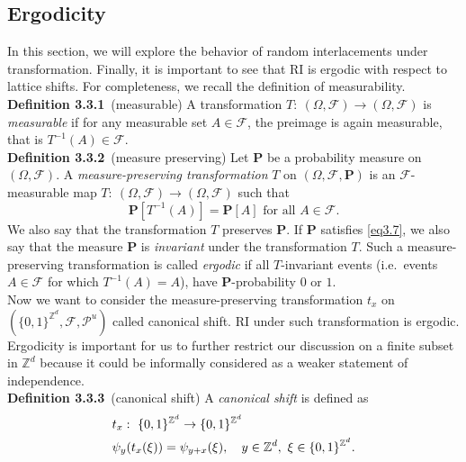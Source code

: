 \documentclass[
11pt, %
a4paper, %
oneside, %
headinclude,footinclude, %
BCOR5mm, %
]{scrartcl}
\begin{document}
\subsection{Ergodicity}
In this section, we will explore the behavior of random interlacements under transformation. Finally, it is important to see that RI is ergodic with respect to lattice shifts. For completeness, we recall the definition of measurability.
\vspace{0.6em}\\\textbf{Definition 3.3.1}\ (measurable) A transformation $T:\ (\Omega,\mathscr{F}) \rightarrow (\Omega,\mathscr{F})$ is \textit{measurable} if for any measurable set $A \in \mathscr{F}$, the preimage is again measurable, that is $T^{-1}(A) \in \mathscr{F}$.
\vspace{0.6em}\\\textbf{Definition 3.3.2}\ (measure preserving) Let $\mathbf{P}$ be a probability measure on $(\Omega, \mathscr{F})$. A \textit{measure-preserving transformation} $T$ on $(\Omega, \mathscr{F}, \mathbf{P})$ is an $\mathscr{F}$-measurable map $T: \ (\Omega,\mathscr{F}) \rightarrow (\Omega,\mathscr{F})$ such that
\begin{equation}
    \label{eq3.7}
    \mathbf{P}[T^{-1}(A)]=\mathbf{P}[A] \text{ for all }A \in \mathscr{F}. \tag{3.7}
\end{equation}
We also say that the transformation $T$ preserves $\mathbf{P}$. If $\mathbf{P}$ satisfies \eqref{eq3.7}, we also say that the measure $\mathbf{P}$ is \textit{invariant} under the transformation $T$. Such a measure-preserving transformation is called \textit{ergodic} if all $T$-invariant events (i.e.~events $A \in \mathscr{F}$ for which $T^{-1}(A) = A$), have $\mathbf{P}$-probability $0$ or $1$.
\\Now we want to consider the measure-preserving transformation $t_x$ on \\
$(\{0,1\}^{\mathbb{Z}^d},\mathscr{F},\mathscr{P}^u)$ called canonical shift. RI under such transformation is ergodic. Ergodicity is important for us to further restrict our discussion on a finite subset in $\mathbb{Z}^d$ because it could be informally considered as a weaker statement of independence. 
\vspace{0.6em}\\\textbf{Definition 3.3.3}\ (canonical shift) A \textit{canonical shift} is defined as 
\begin{align}
    &t_x: \ \{0,1\}^{\mathbb{Z}^d} \rightarrow \{0,1\}^{\mathbb{Z}^d} \notag \\
    &\psi_y(t_x(\xi))=\psi_{y+x}(\xi), \quad y \in \mathbb{Z}^d, \ \xi \in \{0,1\}^{\mathbb{Z}^d}. \notag
\end{align}
\end{document}
